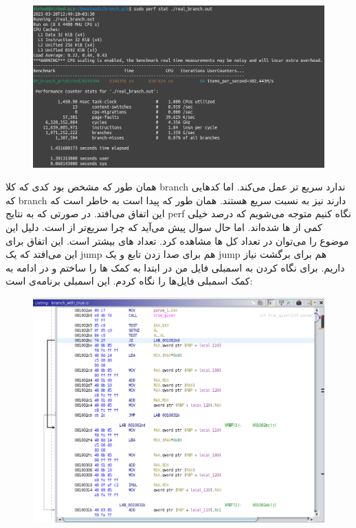 \begin{enumerate}
\begin{enumerate}
\begin{latin}
\begin{itemize}
\begin{figure}[H]
                \centerline{\includegraphics[scale=0.35]{pics/5/A/real_branch.png}}
            \end{figure}
        \end{itemize}
        \end{latin}
        همان طور که مشخص بود کدی که کلا branch ندارد سریع تر عمل می‌کند.
        اما کد‌هایی که branch دارند نیز به نسبت سریع هستند. همان طور که پیدا است به خاطر 
        است که این اتفاق می‌افتد. در صورتی که به نتایج perf نگاه کنیم متوجه می‌شویم که درصد خیلی کمی از
        ها 
        شده‌اند. اما حال سوال پیش می‌آید که چرا
        سریع‌تر از
        است. دلیل این موضوع را می‌توان در تعداد کل ها
        مشاهده کرد. تعداد های
        بیشتر است. این اتفاق برای این می‌افتد که یک jump هم برای صدا زدن تابع 
        و یک jump هم برای برگشت نیاز داریم.
        برای نگاه کردن به اسمبلی فایل من در ابتدا به کمک  ها را ساختم و
        در ادامه به کمک
        اسمبلی فایل‌ها را نگاه کردم. این اسمبلی برنامه‌ی
        است:
        \begin{figure}[H]
            \centerline{\includegraphics[scale=0.4]{pics/5/A/ghidra_branch_with_true.png}}

\end{figure}
\end{enumerate}
\end{enumerate}
